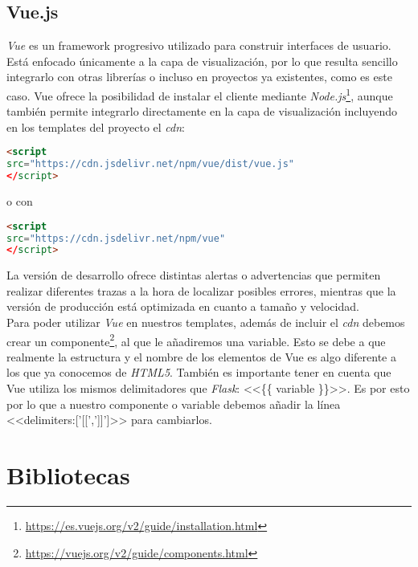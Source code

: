 \subsection{Vue.js}
\textit{Vue} es un framework progresivo utilizado para construir interfaces de usuario. Está enfocado únicamente a la capa de visualización, por lo que resulta sencillo integrarlo con otras librerías o incluso en proyectos ya existentes, como es este caso.
Vue ofrece la posibilidad de instalar el cliente mediante \textit{Node.js}\footnote{\url{https://es.vuejs.org/v2/guide/installation.html}}, aunque también permite integrarlo directamente en la capa de visualización incluyendo en los templates del proyecto el \textit{cdn}:

\renewcommand{\lstlistingname}{Vue.js cdn}%
\renewcommand{\lstlistlistingname}{List of \lstlistingname s}
\begin{lstlisting}[language=html,caption={Versión de desarrollo.}]
<script
src="https://cdn.jsdelivr.net/npm/vue/dist/vue.js"
</script>
\end{lstlisting}
o con
\begin{lstlisting}[language=html,caption={Versión de producción.}]
<script
src="https://cdn.jsdelivr.net/npm/vue"
</script>
\end{lstlisting}
La versión de desarrollo ofrece distintas alertas o advertencias que permiten realizar diferentes trazas a la hora de localizar posibles errores, mientras que la versión de producción está optimizada en cuanto a tamaño y velocidad.
\\
Para poder utilizar \textit{Vue} en nuestros templates, además de incluir el \textit{cdn} debemos crear un componente\footnote{\url{https://vuejs.org/v2/guide/components.html}}, al que le añadiremos una variable. Esto se debe a que realmente la estructura y el nombre de los elementos de Vue es algo diferente a los que ya conocemos de \textit{HTML5}. También es importante tener en cuenta que Vue utiliza los mismos delimitadores que \textit{Flask}: <<\{\{ variable \}\}>>. Es por esto por lo que a nuestro componente o variable debemos añadir la línea <<delimiters:['[[',']]']>> para cambiarlos.


\section{Bibliotecas}

